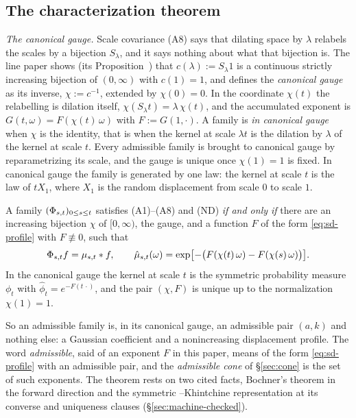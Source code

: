 \subsection{The characterization theorem}\label{sec:characterization-recap}

\emph{The canonical gauge.} Scale covariance (A8) says that dilating space by $\lambda$
relabels the scales by a bijection $S_\lambda$, and it says nothing about what that bijection
is. The line paper shows (its Proposition~) that
$c(\lambda) := S_\lambda 1$ is a continuous strictly increasing bijection of $(0,\infty)$ with
$c(1) = 1$, and defines the \emph{canonical gauge} as its inverse, $\chi := c^{-1}$, extended
by $\chi(0) = 0$. In the coordinate $\chi(t)$ the relabelling is dilation itself,
$\chi(S_\lambda t) = \lambda\,\chi(t)$, and the accumulated exponent is
$G(t,\omega) = F(\chi(t)\,\omega)$ with $F := G(1,\cdot)$. A family is \emph{in canonical
gauge} when $\chi$ is the identity, that is when the kernel at scale $\lambda t$ is the
dilation by $\lambda$ of the kernel at scale $t$. Every admissible family is brought to
canonical gauge by reparametrizing its scale, and the gauge is unique once $\chi(1) = 1$ is
fixed. In canonical gauge the family is generated by one law: the kernel at scale $t$ is
the law of $t X_1$, where $X_1$ is the random displacement from scale $0$ to scale $1$.

\begin{theorem}\label{thm:main-characterization}
A family $(\Phi_{s,t})_{0 \le s \le t}$ satisfies (A1)--(A8) and (ND) \emph{if and only if}
there are an increasing bijection $\chi$ of $[0,\infty)$, the gauge, and a function $F$ of the
form \ref{eq:sd-profile} with $F \not\equiv 0$, such that
\[
  \Phi_{s,t} f = \mu_{s,t} * f, \qquad
  \hat\mu_{s,t}(\omega) = \exp\bigl[-\bigl(F(\chi(t)\,\omega) - F(\chi(s)\,\omega)\bigr)\bigr].
\]
In the canonical gauge the kernel at scale $t$ is the symmetric probability measure $\phi_t$
with $\hat\phi_t = e^{-F(t\,\cdot)}$, and the pair $(\chi,F)$ is unique up to the normalization
$\chi(1) = 1$.
\end{theorem}

So an admissible family is, in its canonical gauge, an admissible pair $(a,k)$ and nothing
else: a Gaussian coefficient and a nonincreasing displacement profile. The word \emph{admissible},
said of an exponent $F$ in this paper, means of the form \ref{eq:sd-profile} with an
admissible pair, and the \emph{admissible cone} of \S\ref{sec:cone} is the set of such
exponents. The theorem rests on two cited facts, Bochner's theorem in the forward direction
and the symmetric \Levy--Khintchine representation at its converse and uniqueness clauses
(\S\ref{sec:machine-checked}).

